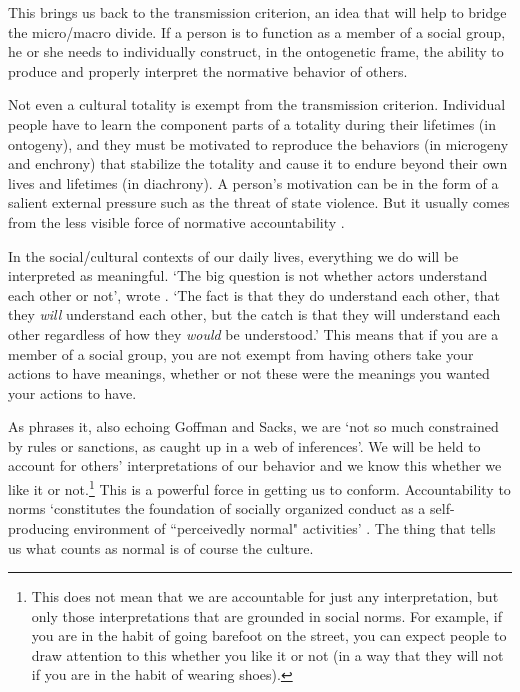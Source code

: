 This brings us back to the transmission criterion, an idea that will help to bridge the micro/macro divide. If a person is to function as a member of a social group, he or she needs to individually construct, in the ontogenetic frame, the ability to produce and properly interpret the normative behavior of others. 



Not even a cultural totality is exempt from the transmission criterion. 
Individual people have to learn the component parts of a totality during 
their lifetimes (in ontogeny), and they must be motivated to reproduce the behaviors 
(in microgeny and enchrony) that stabilize the totality and cause it to endure beyond their own 
lives and lifetimes (in diachrony). A person's motivation can be in the form of a
salient external pressure such as the threat of state violence. But it usually comes from the less visible force of normative accountability \citep{heritage_garfinkel_1984,enfield_relationship_2013}. 



In the social/cultural contexts of our daily lives, everything we do will be interpreted as meaningful. \textquoteleft The big question is not whether 
actors understand each other or not', wrote \citet[367]{garfinkel_perception_1952}. \textquoteleft The fact is that they do understand each other, 
that they \textit{will} understand each other, but the catch is that 
they will understand each other regardless of how they \textit{would} 
be understood.' This means that if you are a member of a social group, you are not 
exempt from having others take your actions to have meanings, whether or 
not these were the meanings you wanted your actions to have. 



As \citet[321]{levinson_pragmatics_1983} phrases it, also echoing Goffman and Sacks, we 
are \textquoteleft not so much constrained by rules or sanctions, as caught up in a 
web of inferences'. We will be held to account for others' 
interpretations of our behavior and we know this whether we like it or 
not.\footnote{This does not mean that we are accountable for just any interpretation, but only those interpretations that are grounded in social norms. For example, if you are in the habit of going barefoot on the street, you can expect people to draw attention to this whether you like it or not (in a way that they will not if you are in the habit of wearing shoes).} This is a powerful force in getting us to conform. Accountability 
to norms \textquoteleft constitutes the foundation of socially organized conduct as a 
self-producing environment of \textquotedblleft perceivedly normal" activities' 
\citep[119]{heritage_garfinkel_1984}. The thing that tells us what counts as normal is of 
course the culture. 



